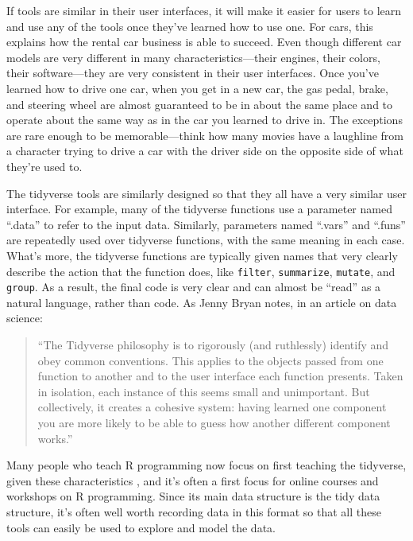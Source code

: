 \documentclass[]{tufte-book}
\begin{document}
If tools are similar in their user interfaces, it will make it
easier for users to learn and use any of the tools once
they've learned how to use one. For cars, this explains how the rental car
business is able to succeed. Even though different car models are very different
in many characteristics---their engines, their colors, their software---they are
very consistent in their user interfaces. Once you've learned how to drive one
car, when you get in a new car, the gas pedal, brake, and steering wheel are
almost guaranteed to be in about the same place and to operate about the same
way as in the car you learned to drive in. The exceptions are rare enough to be
memorable---think how many movies have a laughline from a character trying to
drive a car with the driver side on the opposite side of what they're used to.

The tidyverse tools are similarly designed so that they all have a very similar
user interface. For example, many of the tidyverse functions use a parameter
named ``.data'' to refer to the input data. Similarly, parameters
named ``.vars'' and ``.funs'' are repeatedly used over tidyverse functions, with the
same meaning in each case. What's more, the tidyverse functions are typically given names
that very clearly describe the action that the function does, like \texttt{filter},
\texttt{summarize}, \texttt{mutate}, and \texttt{group}. As a result, the final code is very clear
and can almost be ``read'' as a natural language, rather than code. As Jenny
Bryan notes, in an article on data science:

\begin{quote}
``The Tidyverse
philosophy is to rigorously (and ruthlessly) identify and obey common
conventions. This applies to the objects passed from one function to another
and to the user interface each function presents. Taken in isolation, each
instance of this seems small and unimportant. But collectively, it creates
a cohesive system: having learned one component you are more likely to be
able to guess how another different component works.''
\citep{bryan2017data}
\end{quote}

Many people who teach
R programming now focus on first teaching the tidyverse, given these
characteristics \citep{robinson2017teach, peng2018teaching}, and it's often a
first focus for online courses and workshops on R programming. Since its main
data structure is the tidy data structure, it's often well worth recording
data in this format so that all these tools can easily be used to explore and
model the data.
\end{document}
